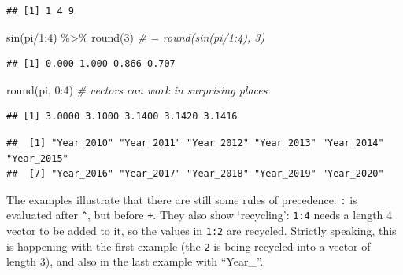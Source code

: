 \documentclass[
]{book}
\newenvironment{Shaded}{\begin{snugshade}}{\end{snugshade}}
\newcommand{\CommentTok}[1]{\textcolor[rgb]{0.56,0.35,0.01}{\textit{#1}}}
\newcommand{\DecValTok}[1]{\textcolor[rgb]{0.00,0.00,0.81}{#1}}
\newcommand{\FunctionTok}[1]{\textcolor[rgb]{0.00,0.00,0.00}{#1}}
\newcommand{\NormalTok}[1]{#1}
\newcommand{\SpecialCharTok}[1]{\textcolor[rgb]{0.00,0.00,0.00}{#1}}
\newcommand{\StringTok}[1]{\textcolor[rgb]{0.31,0.60,0.02}{#1}}
\begin{document}
\begin{verbatim}
## [1] 1 4 9
\end{verbatim}

\begin{Shaded}
\begin{Highlighting}[]
\FunctionTok{sin}\NormalTok{(pi}\SpecialCharTok{/}\DecValTok{1}\SpecialCharTok{:}\DecValTok{4}\NormalTok{) }\SpecialCharTok{\%\textgreater{}\%} \FunctionTok{round}\NormalTok{(}\DecValTok{3}\NormalTok{)  }\CommentTok{\# = round(sin(pi/1:4), 3)}
\end{Highlighting}
\end{Shaded}

\begin{verbatim}
## [1] 0.000 1.000 0.866 0.707
\end{verbatim}

\begin{Shaded}
\begin{Highlighting}[]
\FunctionTok{round}\NormalTok{(pi, }\DecValTok{0}\SpecialCharTok{:}\DecValTok{4}\NormalTok{) }\CommentTok{\# vectors can work in surprising places}
\end{Highlighting}
\end{Shaded}

\begin{verbatim}
## [1] 3.0000 3.1000 3.1400 3.1420 3.1416
\end{verbatim}

\begin{Shaded}
\end{Shaded}

\begin{verbatim}
##  [1] "Year_2010" "Year_2011" "Year_2012" "Year_2013" "Year_2014" "Year_2015"
##  [7] "Year_2016" "Year_2017" "Year_2018" "Year_2019" "Year_2020"
\end{verbatim}

The examples illustrate that there are still some rules of precedence: \texttt{:} is evaluated after \texttt{\^{}}, but before \texttt{+}. They also show `recycling': \texttt{1:4} needs a length 4 vector to be added to it, so the values in \texttt{1:2} are recycled. Strictly speaking, this is happening with the first example (the \texttt{2} is being recycled into a vector of length 3), and also in the last example with ``Year\_''.
\end{document}
